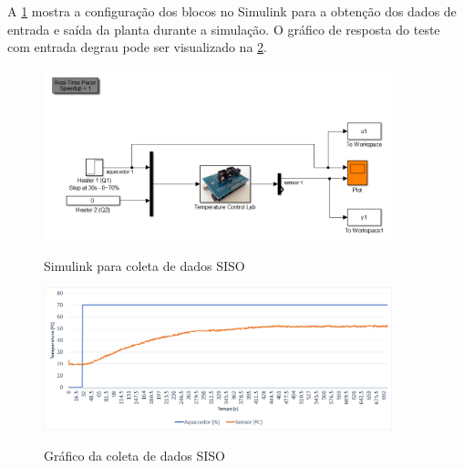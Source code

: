A \cref{fig:siso_step_test_simulink} mostra a configuração dos blocos no Simulink para a obtenção
dos dados de entrada e saída da planta durante a simulação. O gráfico de resposta do teste com
entrada degrau pode ser visualizado na \cref{fig:siso_step_test_plot}.

\begin{figure}[h]
    \caption{Simulink para coleta de dados SISO}
	\begin{center}
		\includegraphics[width=0.9\textwidth]{./5_images/Exp_101_Simulink.png} 
		\label{fig:siso_step_test_simulink}
	\end{center}
    \centering
\end{figure}

\begin{figure}
    \caption{Gráfico da coleta de dados SISO}
	\begin{center}
		\includegraphics[width=0.9\textwidth]{./5_images/Exp_101_StepTestPlot.png} 
		\label{fig:siso_step_test_plot}
	\end{center}
    \centering
\end{figure}

